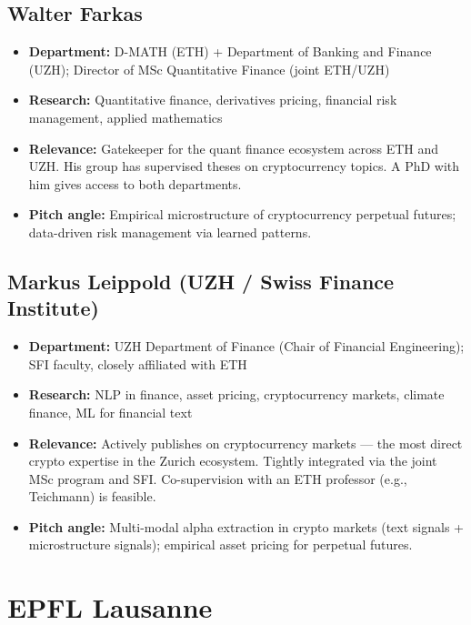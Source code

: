 \documentclass[11pt,a4paper]{article}
\begin{document}
\subsection{Walter Farkas}
\begin{itemize}
  \item \textbf{Department:} D-MATH (ETH) + Department of Banking and Finance (UZH); Director of MSc Quantitative Finance (joint ETH/UZH)
  \item \textbf{Research:} Quantitative finance, derivatives pricing, financial risk management, applied mathematics
  \item \textbf{Relevance:} Gatekeeper for the quant finance ecosystem across ETH and UZH. His group has supervised theses on cryptocurrency topics. A PhD with him gives access to both departments.
  \item \textbf{Pitch angle:} Empirical microstructure of cryptocurrency perpetual futures; data-driven risk management via learned patterns.
\end{itemize}

\subsection{Markus Leippold (UZH / Swiss Finance Institute)}
\begin{itemize}
  \item \textbf{Department:} UZH Department of Finance (Chair of Financial Engineering); SFI faculty, closely affiliated with ETH
  \item \textbf{Research:} NLP in finance, asset pricing, cryptocurrency markets, climate finance, ML for financial text
  \item \textbf{Relevance:} Actively publishes on cryptocurrency markets --- the most direct crypto expertise in the Zurich ecosystem. Tightly integrated via the joint MSc program and SFI. Co-supervision with an ETH professor (e.g., Teichmann) is feasible.
  \item \textbf{Pitch angle:} Multi-modal alpha extraction in crypto markets (text signals + microstructure signals); empirical asset pricing for perpetual futures.
\end{itemize}

\section{EPFL Lausanne}
\end{document}
